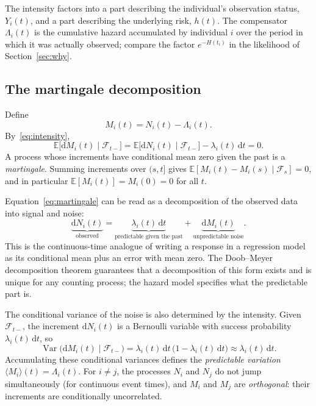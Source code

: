 \documentclass[11pt]{article}
\theoremstyle{definition}
\theoremstyle{plain}
\newcommand{\E}{\mathbb{E}}
\newcommand{\dd}{\,\mathrm{d}}
\begin{document}
The intensity factors into a part describing the individual's observation status, $Y_i(t)$, and a part describing the underlying risk, $h(t)$. The compensator $\Lambda_i(t)$ is the cumulative hazard accumulated by individual $i$ over the period in which it was actually observed; compare the factor $e^{-H(t_i)}$ in the likelihood of Section~\ref{sec:why}.

\subsection{The martingale decomposition}

Define
\begin{equation}\label{eq:martingale}
  M_i(t) = N_i(t) - \Lambda_i(t).
\end{equation}
By~\eqref{eq:intensity},
\[
  \E\bigl[\mathrm{d}M_i(t) \mid \mathcal{F}_{t-}\bigr]
  = \E\bigl[\mathrm{d}N_i(t) \mid \mathcal{F}_{t-}\bigr] - \lambda_i(t)\dd t
  = 0.
\]
A process whose increments have conditional mean zero given the past is a \emph{martingale}. Summing increments over $(s, t]$ gives $\E[M_i(t) - M_i(s) \mid \mathcal{F}_s] = 0$, and in particular $\E[M_i(t)] = M_i(0) = 0$ for all $t$.

Equation~\eqref{eq:martingale} can be read as a decomposition of the observed data into signal and noise:
\[
  \underbrace{\mathrm{d}N_i(t)}_{\text{observed}}
  = \underbrace{\lambda_i(t)\dd t}_{\text{predictable given the past}}
  + \underbrace{\mathrm{d}M_i(t)}_{\text{unpredictable noise}}.
\]
This is the continuous-time analogue of writing a response in a regression model as its conditional mean plus an error with mean zero. The Doob--Meyer decomposition theorem guarantees that a decomposition of this form exists and is unique for any counting process; the hazard model specifies what the predictable part is.

The conditional variance of the noise is also determined by the intensity. Given $\mathcal{F}_{t-}$, the increment $\mathrm{d}N_i(t)$ is a Bernoulli variable with success probability $\lambda_i(t)\dd t$, so
\[
  \operatorname{Var}\bigl(\mathrm{d}M_i(t) \mid \mathcal{F}_{t-}\bigr)
  = \lambda_i(t)\dd t\,\bigl(1 - \lambda_i(t)\dd t\bigr)
  \approx \lambda_i(t)\dd t.
\]
Accumulating these conditional variances defines the \emph{predictable variation} $\langle M_i \rangle(t) = \Lambda_i(t)$. For $i \ne j$, the processes $N_i$ and $N_j$ do not jump simultaneously (for continuous event times), and $M_i$ and $M_j$ are \emph{orthogonal}: their increments are conditionally uncorrelated.
\end{document}
